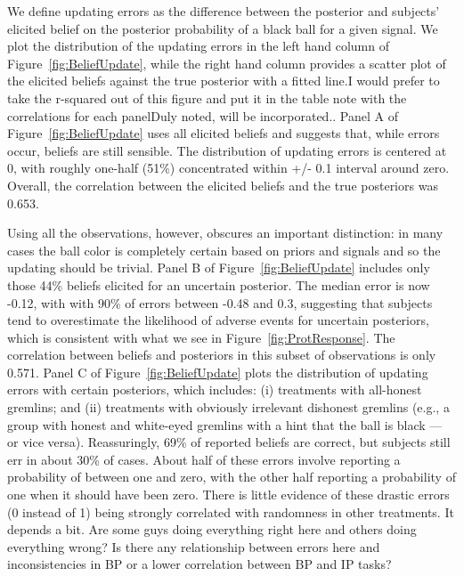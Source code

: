 \documentclass[12pt,a4paper]{article}
\newcommand{\aut}[1]{{\color{Red}#1}}
\newcommand{\pmt}[1]{{\color{Blue}#1}}
\begin{document}
We define updating errors as the difference between the posterior and subjects’ elicited belief on the posterior probability of a black ball for a given signal.  We plot the distribution of the updating errors in the left hand column of Figure~\ref{fig:BeliefUpdate}, while the right hand column provides a scatter plot of the elicited beliefs against the true posterior with a fitted line.\pmt{I would prefer to take the r-squared out of this figure and put it in the table note with the correlations for each panel}\aut{Duly noted, will be incorporated.}.
Panel A of Figure~\ref{fig:BeliefUpdate} uses all elicited beliefs and suggests that, while errors occur, beliefs are still sensible. The distribution of updating errors is centered at 0, with roughly one-half (51\%) concentrated within +/- 0.1 interval around zero. Overall, the correlation between the elicited beliefs and the true posteriors was 0.653.  

Using all the observations, however, obscures an important distinction: in many cases the ball color is completely certain based on priors and signals and so the updating should be trivial.  Panel B of Figure~\ref{fig:BeliefUpdate} includes only those 44\% beliefs elicited for an uncertain posterior. The median error is now -0.12, with with 90\% of errors between -0.48 and 0.3, suggesting that subjects tend to overestimate the likelihood of adverse events for uncertain posteriors, \pmt{which is consistent with what we see in Figure~\ref{fig:ProtResponse}}. The correlation between beliefs and posteriors in this subset of observations is only 0.571.  Panel C of Figure~\ref{fig:BeliefUpdate} plots the distribution of updating errors with certain posteriors, which includes: (i) treatments with all-honest gremlins; and (ii) treatments with obviously irrelevant dishonest gremlins (e.g., a group with honest and white-eyed gremlins with a hint that the ball is black — or vice versa). Reassuringly, 69\% of reported beliefs are correct, but subjects still err in about 30\% of cases. About half of these errors involve reporting a probability of between one and zero, with the other half reporting a probability of one when it should have been zero. \aut{There is little evidence of these drastic errors (0 instead of 1) being strongly correlated with randomness in other treatments.} \pmt{It depends a bit.  Are some guys doing everything right here and others doing everything wrong?  Is there any relationship between errors here and inconsistencies in BP or a lower correlation between BP and IP tasks?} 
\end{document}
